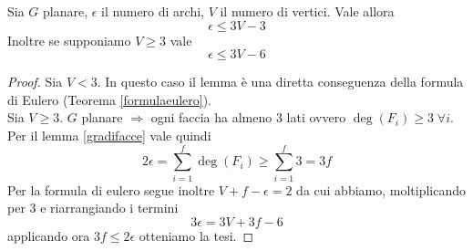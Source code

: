 \begin{proposizione}\label{criterioNonPlan}
    Sia \(G\) planare, \(\epsilon\) il numero di archi, \(V\) il numero di vertici. Vale allora
    \begin{equation}
        \epsilon \leq 3V - 3
    \end{equation}
    Inoltre se supponiamo \(V \geq 3\) vale
    \begin{equation}
        \epsilon \leq 3V - 6
    \end{equation}
    \begin{proof}
        Sia \(V<3\). In questo caso il lemma è una diretta conseguenza della formula di Eulero (Teorema {\ref{formulaeulero}}). \\
        Sia \(V\geq 3\). \(G\) planare \(\Rightarrow\) ogni faccia ha almeno 3 lati ovvero \(\deg(F_i) \geq 3\; \forall i\). Per il lemma {\ref{gradifacce}} vale quindi
        \begin{equation}
            2\epsilon = \sum_{i=1}^f \deg(F_i) \geq \sum_{i=1}^f 3 = 3f
        \end{equation}
        Per la formula di eulero segue inoltre \(V+f-\epsilon = 2\) da cui abbiamo, moltiplicando per 3 e riarrangiando i termini
        \begin{equation}
            3\epsilon = 3V + 3f - 6
        \end{equation}
        applicando ora \(3f\leq 2 \epsilon\) otteniamo la tesi.
    \end{proof}
\end{proposizione}

